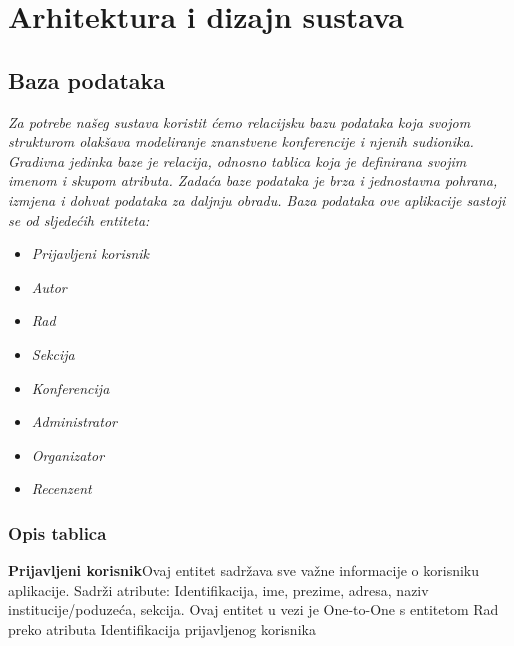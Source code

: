 \chapter{Arhitektura i dizajn sustava}		

				
		\section{Baza podataka}
			
			\textit{Za potrebe našeg sustava koristit ćemo relacijsku bazu podataka koja svojom strukturom olakšava modeliranje znanstvene konferencije i njenih sudionika. Gradivna jedinka baze je relacija, odnosno tablica koja je definirana svojim imenom i skupom atributa. Zadaća baze podataka je brza i jednostavna pohrana, izmjena i dohvat podataka za daljnju obradu.
				Baza podataka ove aplikacije sastoji se od sljedećih entiteta:}
			
			\begin{itemize}
				\item 	\textit{Prijavljeni korisnik}
				\item 	\textit{Autor}
				\item 	\textit{Rad}
				\item 	\textit{Sekcija}
				\item 	\textit{Konferencija}
				\item 	\textit{Administrator}
				\item 	\textit{Organizator}
				\item 	\textit{Recenzent}		
			\end{itemize}
			
			\subsection{Opis tablica}
			
			
			\textbf{Prijavljeni korisnik}\space\space\space Ovaj entitet sadržava sve važne informacije o korisniku aplikacije.
				Sadrži atribute: Identifikacija, ime, prezime, adresa, naziv institucije/poduzeća, sekcija. Ovaj entitet u vezi je One-to-One s entitetom Rad preko atributa Identifikacija prijavljenog korisnika
			
